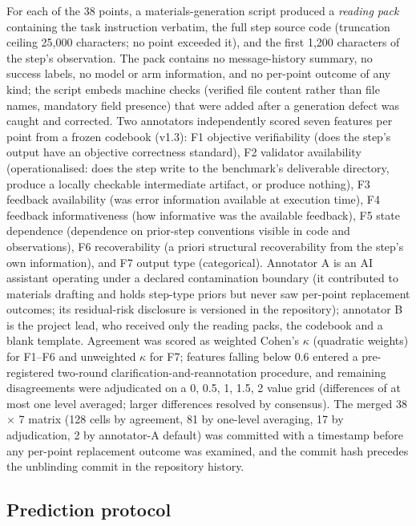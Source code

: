 For each of the 38 points, a materials-generation script produced a \emph{reading pack} containing the task instruction verbatim, the full step source code (truncation ceiling 25,000 characters; no point exceeded it), and the first 1,200 characters of the step's observation. The pack contains no message-history summary, no success labels, no model or arm information, and no per-point outcome of any kind; the script embeds machine checks (verified file content rather than file names, mandatory field presence) that were added after a generation defect was caught and corrected. Two annotators independently scored seven features per point from a frozen codebook (v1.3): F1 objective verifiability (does the step's output have an objective correctness standard), F2 validator availability (operationalised: does the step write to the benchmark's deliverable directory, produce a locally checkable intermediate artifact, or produce nothing), F3 feedback availability (was error information available at execution time), F4 feedback informativeness (how informative was the available feedback), F5 state dependence (dependence on prior-step conventions visible in code and observations), F6 recoverability (a priori structural recoverability from the step's own information), and F7 output type (categorical). Annotator A is an AI assistant operating under a declared contamination boundary (it contributed to materials drafting and holds step-type priors but never saw per-point replacement outcomes; its residual-risk disclosure is versioned in the repository); annotator B is the project lead, who received only the reading packs, the codebook and a blank template. Agreement was scored as weighted Cohen's $\kappa$ (quadratic weights) for F1--F6 and unweighted $\kappa$ for F7; features falling below 0.6 entered a pre-registered two-round clarification-and-reannotation procedure, and remaining disagreements were adjudicated on a {0, 0.5, 1, 1.5, 2} value grid (differences of at most one level averaged; larger differences resolved by consensus). The merged 38 $\times$ 7 matrix (128 cells by agreement, 81 by one-level averaging, 17 by adjudication, 2 by annotator-A default) was committed with a timestamp before any per-point replacement outcome was examined, and the commit hash precedes the unblinding commit in the repository history.

\subsection*{Prediction protocol}

